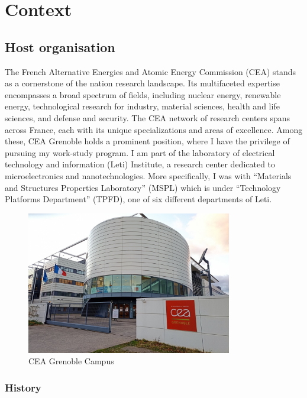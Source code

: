 \section{Context}
\subsection{Host organisation}

\medskip

The French Alternative Energies and Atomic Energy Commission (CEA) stands as a cornerstone
of the nation research landscape. Its multifaceted expertise encompasses a broad spectrum
of fields, including nuclear energy, renewable energy, technological research for industry, material sciences, health and life sciences, and defense and security. The CEA network
of research centers spans across France, each with its unique specializations and areas
of excellence. Among these, CEA Grenoble holds a prominent position, where I have the 
privilege of pursuing my work-study program. I am part of the laboratory of electrical technology and information (Leti) Institute,
a research center dedicated to microelectronics and nanotechnologies. More specifically, 
I was with “Materials and Structures Properties Laboratory” (MSPL) which is under “Technology Platforms 
Department” (TPFD), one of six different departments of Leti.


\begin{figure}[h!]
    \centering
    \includegraphics[width=0.8\textwidth]{images/ceaphoto.jpg}
    \caption{CEA Grenoble Campus}
\end{figure}

\FloatBarrier

\subsubsection{History}

